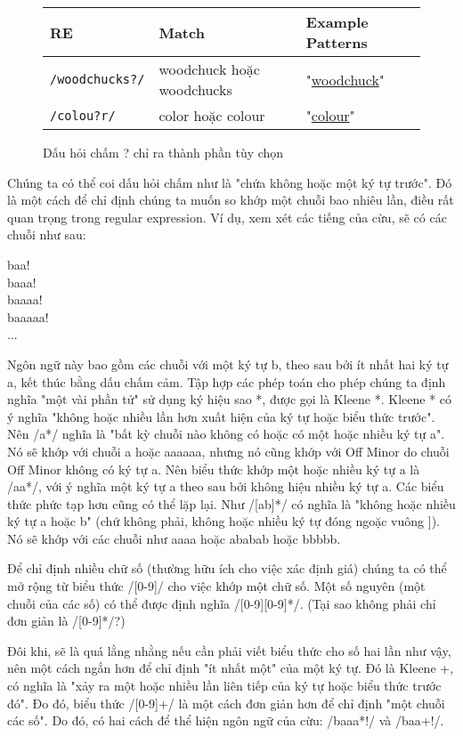\begin{figure}[h]
	\begin{tabular}{ l l l }
	 \hline
	 RE & Match & Example Patterns \\
	 \hline
	 \verb|/woodchucks?/| & woodchuck hoặc woodchucks & "\underline{woodchuck}" \\
	 \verb|/colou?r/| & color hoặc colour & "\underline{colour}" \\
	 \hline
	\end{tabular}
 \caption{Dấu hỏi chấm ? chỉ ra thành phần tùy chọn}
 \label{table:2.5}
\end{figure}

Chúng ta có thể coi dấu hỏi chấm như là "chứa không hoặc một ký tự trước". Đó là một cách để chỉ định chúng ta muốn so khớp một chuỗi bao nhiêu lần, điều rất quan trọng trong regular expression. Ví dụ, xem xét các tiếng của cừu, sẽ có các chuỗi như sau:

baa!\\
\indent baaa!\\
\indent baaaa!\\
\indent baaaaa!\\
\indent ...

Ngôn ngữ này bao gồm các chuỗi với một ký tự b, theo sau bởi ít nhất hai ký tự a, kết thúc bằng dấu chấm cảm. Tập hợp các phép toán cho phép chúng ta định nghĩa "một vài phần tử" sử dụng ký hiệu sao *, được gọi là Kleene *. Kleene * có ý nghĩa "không hoặc nhiều lần hơn xuất hiện của ký tự hoặc biểu thức trước". Nên /a*/ nghĩa là "bất kỳ chuỗi nào không có hoặc có một hoặc nhiều ký tự a". Nó sẽ khớp với chuỗi a hoặc aaaaaa, nhưng nó cũng khớp với Off Minor do chuỗi Off Minor không có ký tự a. Nên biểu thức khớp một hoặc nhiều ký tự a là /aa*/, với ý nghĩa một ký tự a theo sau bởi không hiệu nhiều ký tự a. Các biểu thức phức tạp hơn cũng có thể lặp lại. Như /[ab]*/ có nghĩa là "không hoặc nhiều ký tự a hoặc b" (chứ không phải, không hoặc nhiều ký tự đóng ngoặc vuông ]). Nó sẽ khớp với các chuỗi như aaaa hoặc ababab hoặc bbbbb.

Để chỉ định nhiều chữ số (thường hữu ích cho việc xác định giá) chúng ta có thể mở rộng từ biểu thức /[0-9]/ cho việc khớp một chữ số. Một số nguyên (một chuỗi của các số) có thể được định nghĩa /[0-9][0-9]*/. (Tại sao không phải chỉ đơn giản là /[0-9]*/?)

Đôi khi, sẽ là quá lằng nhằng nếu cần phải viết biểu thức cho số hai lần như vậy, nên một cách ngắn hơn để chỉ định "ít nhất một" của một ký tự. Đó là Kleene +, có nghĩa là "xảy ra một hoặc nhiều lần liên tiếp của ký tự hoặc biểu thức trước đó". Đo đó, biểu thức /[0-9]+/ là một cách đơn giản hơn để chỉ định "một chuỗi các số". Do đó, có hai cách để thể hiện ngôn ngữ của cừu: /baaa*!/ và /baa+!/.

